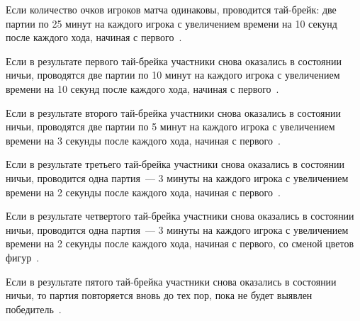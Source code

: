 Если количество очков игроков матча одинаковы, проводится тай-брейк: две партии по 25 минут на каждого игрока с увеличением времени на 10 секунд после каждого хода, начиная с первого~\cite{fidewc}.

Если в результате первого тай-брейка участники снова оказались в состоянии ничьи, проводятся две партии по 10 минут на каждого игрока с увеличением времени на 10 секунд после каждого хода, начиная с первого~\cite{fidewc}.

Если в результате второго тай-брейка участники снова оказались в состоянии ничьи, проводятся две партии по 5 минут на каждого игрока с увеличением времени на 3 секунды после каждого хода, начиная с первого~\cite{fidewc}.

Если в результате третьего тай-брейка участники снова оказались в состоянии ничьи, проводится одна партия~--- 3 минуты на каждого игрока с увеличением времени на 2 секунды после каждого хода, начиная с первого~\cite{fidewc}.

Если в результате четвертого тай-брейка участники снова оказались в состоянии ничьи, проводится одна партия~--- 3 минуты на каждого игрока с увеличением времени на 2 секунды после каждого хода, начиная с первого, со сменой цветов фигур~\cite{fidewc}.

Если в результате пятого тай-брейка участники снова оказались в состоянии ничьи, то партия повторяется вновь до тех пор, пока не будет выявлен победитель~\cite{fidewc}.

